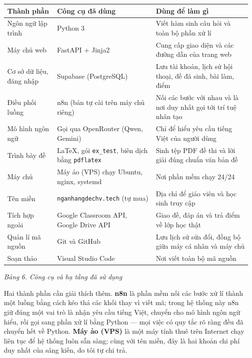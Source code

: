 \begin{center}
\begin{longtable}{|p{3.6cm}|p{4.6cm}|p{6.2cm}|}
\hline
\textbf{Thành phần} & \textbf{Công cụ đã dùng} & \textbf{Dùng để làm gì} \\ \hline
\endhead
Ngôn ngữ lập trình & Python 3 & Viết hàm sinh câu hỏi và toàn bộ phần xử lí \\ \hline
Máy chủ web & FastAPI + Jinja2 & Cung cấp giao diện và các đường dẫn của trang web \\ \hline
Cơ sở dữ liệu, đăng nhập & Supabase (PostgreSQL) & Lưu tài khoản, lịch sử hội thoại, đề đã sinh, bài làm, điểm \\ \hline
Điều phối luồng & n8n (bản tự cài trên máy chủ riêng) & Nối các bước với nhau và là nơi duy nhất gọi tới trí tuệ nhân tạo \\ \hline
Mô hình ngôn ngữ & Gọi qua OpenRouter (Qwen, Gemini) & Chỉ để hiểu yêu cầu tiếng Việt của người dùng \\ \hline
Trình bày đề & \LaTeX, gói \texttt{ex\_test}, biên dịch bằng \texttt{pdflatex} & Sinh tệp PDF đề thi và lời giải đúng chuẩn văn bản đề \\ \hline
Máy chủ & Máy ảo (VPS) chạy Ubuntu, nginx, systemd & Nơi phần mềm chạy 24/24 \\ \hline
Tên miền & \texttt{nganhangdechv.tech} (tự mua) & Địa chỉ để giáo viên và học sinh truy cập \\ \hline
Tích hợp ngoài & Google Classroom API, Google Drive API & Giao đề, đáp án và trả điểm về lớp học thật \\ \hline
Quản lí mã nguồn & Git và GitHub & Lưu lịch sử sửa đổi, đồng bộ giữa máy cá nhân và máy chủ \\ \hline
Soạn thảo & Visual Studio Code & Nơi viết toàn bộ mã nguồn \\ \hline
\end{longtable}
\end{center}
\textit{Bảng 6. Công cụ và hạ tầng đã sử dụng}

Hai thành phần cần giải thích thêm. \textbf{n8n} là phần mềm nối các bước xử lí
thành một luồng bằng cách kéo thả các khối thay vì viết mã; trong hệ thống này
n8n giữ đúng một vai trò là nhận yêu cầu tiếng Việt, chuyển cho mô hình ngôn
ngữ hiểu, rồi gọi sang phần xử lí bằng Python --- mọi việc có quy tắc rõ ràng
đều đã chuyển hết về Python. \textbf{Máy ảo (VPS)} là một máy tính thuê trên
Internet chạy liên tục để hệ thống luôn sẵn sàng; cùng với tên miền, đây là hai
khoản chi phí duy nhất của sáng kiến, do tôi tự chi trả.

